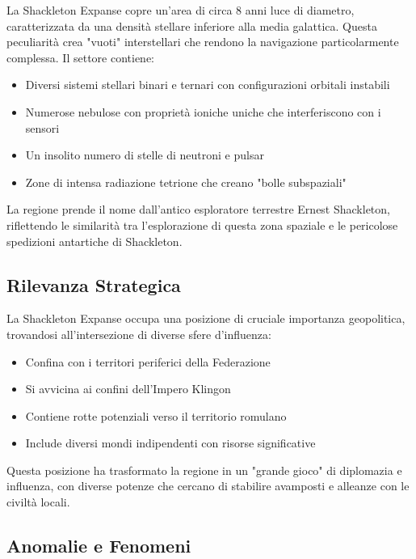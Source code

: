 \documentclass[letterpaper,twocolumn,openany,nodeprecatedcode]{dndbook}
\begin{document}
La Shackleton Expanse copre un'area di circa 8 anni luce di diametro, caratterizzata da una densità stellare inferiore alla media galattica. Questa peculiarità crea "vuoti" interstellari che rendono la navigazione particolarmente complessa. Il settore contiene:

\begin{itemize}
    \item Diversi sistemi stellari binari e ternari con configurazioni orbitali instabili
    \item Numerose nebulose con proprietà ioniche uniche che interferiscono con i sensori
    \item Un insolito numero di stelle di neutroni e pulsar
    \item Zone di intensa radiazione tetrione che creano "bolle subspaziali"
\end{itemize}

La regione prende il nome dall'antico esploratore terrestre Ernest Shackleton, riflettendo le similarità tra l'esplorazione di questa zona spaziale e le pericolose spedizioni antartiche di Shackleton.

\subsection{Rilevanza Strategica}

La Shackleton Expanse occupa una posizione di cruciale importanza geopolitica, trovandosi all'intersezione di diverse sfere d'influenza:

\begin{itemize}
    \item Confina con i territori periferici della Federazione
    \item Si avvicina ai confini dell'Impero Klingon
    \item Contiene rotte potenziali verso il territorio romulano
    \item Include diversi mondi indipendenti con risorse significative
\end{itemize}

Questa posizione ha trasformato la regione in un "grande gioco" di diplomazia e influenza, con diverse potenze che cercano di stabilire avamposti e alleanze con le civiltà locali.

\subsection{Anomalie e Fenomeni}
\end{document}
